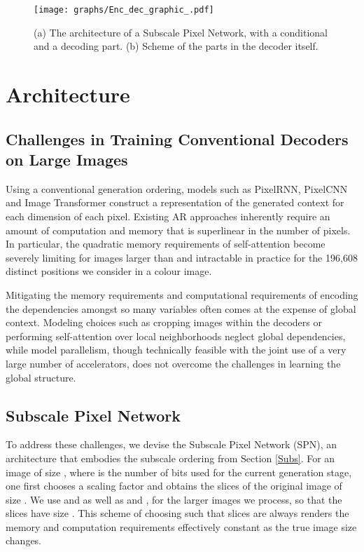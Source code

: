 \documentclass{article} \usepackage{iclr2019_conference,times}
\begin{document}
\begin{figure}
\centering
\texttt{[image: graphs/Enc\_dec\_graphic\_.pdf]}
\vspace{-0.5cm}
\label{fig:architecture}
\caption{(a) The architecture of a Subscale Pixel Network, with a conditional and a decoding part. (b) Scheme of the parts in the decoder itself.}
\end{figure}
\section{Architecture}
\vspace{-0.3cm}

\subsection{Challenges in Training Conventional Decoders on Large Images}

Using a conventional generation ordering, models such as PixelRNN, PixelCNN \citep{PixelRNN} and Image Transformer \citep{Parmar18} construct a representation of the generated context for each dimension of each pixel. Existing AR approaches inherently require an amount of computation and memory that is superlinear in the number of pixels. In particular, the quadratic memory requirements of self-attention become severely limiting for images larger than  and intractable in practice for the 196,608 distinct positions we consider in a  colour image.

Mitigating the memory requirements and computational requirements of encoding the dependencies amongst so many variables often comes at the expense of global context. Modeling choices such as cropping images within the decoders \citep{vpn} or performing self-attention over local neighborhoods \citep{Parmar18} neglect global dependencies, while model parallelism, though technically feasible with the joint use of a very large number of accelerators, does not overcome the challenges in learning the global structure.

\subsection{Subscale Pixel Network}

To address these challenges, we devise the Subscale Pixel Network (SPN), an architecture that embodies the subscale ordering from Section \ref{Subs}. For an image of size , where  is the number of bits used for the current generation stage, one first chooses a scaling factor  and obtains the  slices of the original image of size . We use  and  as well as  and , for the larger images we process, so that the slices have size . This scheme of choosing  such that slices are always  renders the memory and computation requirements effectively constant as the true image size  changes.
\end{document}
